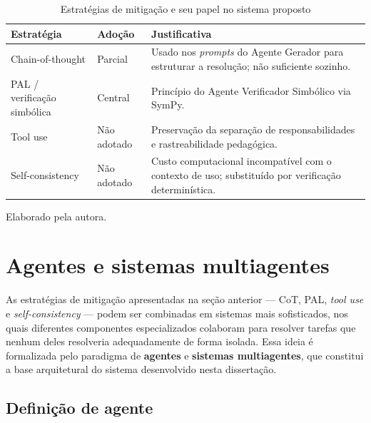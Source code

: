\begin{table}[htbp]
\centering
\caption{Estratégias de mitigação e seu papel no sistema proposto}
\label{tab:estrategias}
\begin{tabular}{@{}p{3.2cm}p{2.4cm}p{6.5cm}@{}}
\toprule
\textbf{Estratégia} & \textbf{Adoção} & \textbf{Justificativa} \\
\midrule
Chain-of-thought & Parcial & Usado nos \emph{prompts} do Agente Gerador para estruturar a resolução; não suficiente sozinho. \\
PAL / verificação simbólica & Central & Princípio do Agente Verificador Simbólico via SymPy. \\
Tool use & Não adotado & Preservação da separação de responsabilidades e rastreabilidade pedagógica. \\
Self-consistency & Não adotado & Custo computacional incompatível com o contexto de uso; substituído por verificação determinística. \\
\bottomrule
\end{tabular}

\smallskip
{\footnotesize Elaborado pela autora.}
\end{table}

\section{Agentes e sistemas multiagentes}
\label{sec:agentes}


As estratégias de mitigação apresentadas na seção anterior --- CoT, PAL, \emph{tool use} e
\emph{self-consistency} --- podem ser combinadas em sistemas mais sofisticados, nos quais diferentes
componentes especializados colaboram para resolver tarefas que nenhum deles resolveria adequadamente
de forma isolada. Essa ideia é formalizada pelo paradigma de \textbf{agentes} e \textbf{sistemas
multiagentes}, que constitui a base arquitetural do sistema desenvolvido nesta dissertação.

\subsection{Definição de agente}
\label{sub:agente}

